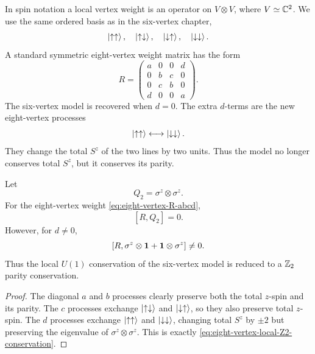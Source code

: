 In spin notation a local vertex weight is an operator on
$V\otimes V$, where $V\simeq\mathbb{C}^2$.  We use the same ordered basis as in the
six-vertex chapter,
\begin{equation}
    \left|\uparrow\uparrow\right\rangle,\quad
    \left|\uparrow\downarrow\right\rangle,\quad
    \left|\downarrow\uparrow\right\rangle,\quad
    \left|\downarrow\downarrow\right\rangle.
\end{equation}
A standard symmetric eight-vertex weight matrix has the form
\begin{equation}
\label{eq:eight-vertex-R-abcd}
    R=
    \begin{pmatrix}
        a&0&0&d\\
        0&b&c&0\\
        0&c&b&0\\
        d&0&0&a
    \end{pmatrix}.
\end{equation}
The six-vertex model is recovered when $d=0$.  The extra $d$-terms are the new
eight-vertex processes
\begin{equation}
\label{eq:eight-vertex-pair-flip-processes}
    \left|\uparrow\uparrow\right\rangle\longleftrightarrow\left|\downarrow\downarrow\right\rangle.
\end{equation}
They change the total $S^z$ of the two lines by two units.  Thus the model no
longer conserves total $S^z$, but it conserves its parity.

\begin{proposition}[$\ZZ_2$ conservation]
Let
\begin{equation}
    Q_2=\sigma^z\otimes\sigma^z .
\end{equation}
For the eight-vertex weight \cref{eq:eight-vertex-R-abcd},
\begin{equation}
\label{eq:eight-vertex-local-Z2-conservation}
    [R,Q_2]=0 .
\end{equation}
However, for $d\neq0$,
\begin{equation}
    \left[R,\sigma^z\otimes\mathbf{1}+\mathbf{1}\otimes\sigma^z\right]\neq0 .
\end{equation}
Thus the local $U(1)$ conservation of the six-vertex model is reduced to a
$\ZZ_2$ parity conservation.
\end{proposition}

\begin{proof}
The diagonal $a$ and $b$ processes clearly preserve both the total $z$-spin and
its parity.  The $c$ processes exchange
$\left|\uparrow\downarrow\right\rangle$ and $\left|\downarrow\uparrow\right\rangle$, so they also preserve
total $z$-spin.  The $d$ processes exchange
$\left|\uparrow\uparrow\right\rangle$ and $\left|\downarrow\downarrow\right\rangle$, changing total $S^z$
by $\pm2$ but preserving the eigenvalue of $\sigma^z\otimes\sigma^z$.  This is
exactly \cref{eq:eight-vertex-local-Z2-conservation}.
\end{proof}

